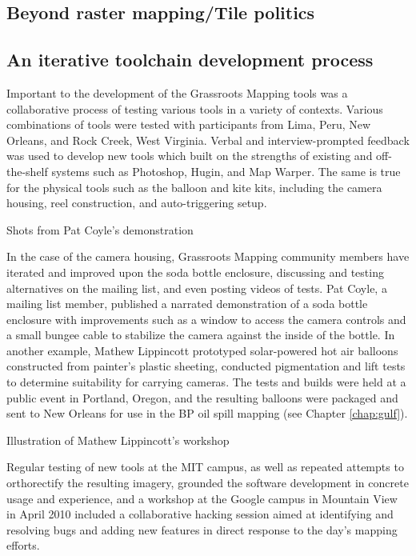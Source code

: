 \documentclass[11pt]{report}
\begin{document}
\subsection{Beyond raster mapping/Tile politics}


\subsection{An iterative toolchain development process}

Important to the development of the Grassroots Mapping tools was a collaborative process of testing various tools in a variety of contexts. Various combinations of tools were tested with participants from Lima, Peru, New Orleans, and Rock Creek, West Virginia. Verbal and interview-prompted feedback was used to develop new tools which built on the strengths of existing and off-the-shelf systems such as Photoshop, Hugin, and Map Warper. The same is true for the physical tools such as the balloon and kite kits, including the camera housing, reel construction, and auto-triggering setup. 

Shots from Pat Coyle's demonstration

In the case of the camera housing, Grassroots Mapping community members have iterated and improved upon the soda bottle enclosure, discussing and testing alternatives on the mailing list, and even posting videos of tests. Pat Coyle, a mailing list member, published a narrated demonstration of a soda bottle enclosure with improvements such as a window to access the camera controls and a small bungee cable to stabilize the camera against the inside of the bottle. In another example, Mathew Lippincott prototyped solar-powered hot air balloons constructed from painter's plastic sheeting, conducted pigmentation and lift tests to determine suitability for carrying cameras. The tests and builds were held at a public event in Portland, Oregon, and the resulting balloons were packaged and sent to New Orleans for use in the BP oil spill mapping (see Chapter \ref{chap:gulf}). 

Illustration of Mathew Lippincott's workshop 

Regular testing of new tools at the MIT campus, as well as repeated attempts to orthorectify the resulting imagery, grounded the software development in concrete usage and experience, and a workshop at the Google campus in Mountain View in April 2010 included a collaborative hacking session aimed at identifying and resolving bugs and adding new features in direct response to the day's mapping efforts. 
\end{document}
